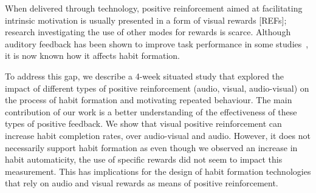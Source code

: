 \documentclass{scaffold/sigchi}
\begin{document}
When delivered through technology, positive reinforcement aimed at facilitating intrinsic motivation is usually presented in a form of visual rewards [REFs]; research investigating the use of other modes for rewards is scarce. Although auditory feedback has been shown to improve task performance in some studies~\cite{}, it is now known how it affects habit formation.




To address this gap, we describe a 4-week situated study that explored the impact of different types of positive reinforcement (audio, visual, audio-visual) on the process of habit formation and motivating repeated behaviour. The main contribution of our work is a better understanding of the effectiveness of these types of positive feedback. We show that visual positive reinforcement can increase habit completion rates, over audio-visual and audio. However, it does not necessarily support habit formation as even though we observed an increase in habit automaticity, the use of specific rewards did not seem to impact this measurement. This has implications for the design of habit formation technologies that rely on audio and visual rewards as means of positive reinforcement.
\end{document}
